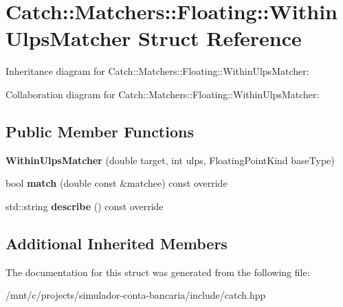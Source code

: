 \hypertarget{structCatch_1_1Matchers_1_1Floating_1_1WithinUlpsMatcher}{}\section{Catch\+:\+:Matchers\+:\+:Floating\+:\+:Within\+Ulps\+Matcher Struct Reference}
\label{structCatch_1_1Matchers_1_1Floating_1_1WithinUlpsMatcher}


Inheritance diagram for Catch\+:\+:Matchers\+:\+:Floating\+:\+:Within\+Ulps\+Matcher\+:


Collaboration diagram for Catch\+:\+:Matchers\+:\+:Floating\+:\+:Within\+Ulps\+Matcher\+:
\subsection*{Public Member Functions}
\begin{DoxyCompactItemize}
\item 
\mbox{\label{structCatch_1_1Matchers_1_1Floating_1_1WithinUlpsMatcher_a836074ae4010275284ab66b2485c6575}} 
{\bfseries Within\+Ulps\+Matcher} (double target, int ulps, Floating\+Point\+Kind base\+Type)
\item 
\mbox{\label{structCatch_1_1Matchers_1_1Floating_1_1WithinUlpsMatcher_aabda42a0dc5d00f3c5916feb75006b32}} 
bool {\bfseries match} (double const \&matchee) const override
\item 
\mbox{\label{structCatch_1_1Matchers_1_1Floating_1_1WithinUlpsMatcher_ad9bc8bb7f3abd326580a4bf6cf369b1b}} 
std\+::string {\bfseries describe} () const override
\end{DoxyCompactItemize}
\subsection*{Additional Inherited Members}


The documentation for this struct was generated from the following file\+:\begin{DoxyCompactItemize}
\item 
/mnt/c/projects/simulador-\/conta-\/bancaria/include/catch.\+hpp\end{DoxyCompactItemize}
